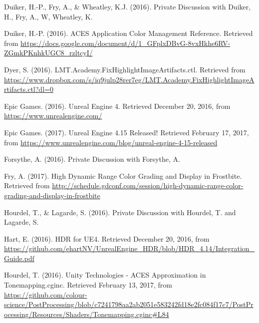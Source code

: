 \documentclass[conference]{IEEEtran}
\begin{document}
\begin{thebibliography}{1}
\renewcommand\@biblabel[1]{[DFW16]}
\bibitem{}
Duiker, H.-P., Fry, A., \& Wheatley, K.J. (2016). Private Discussion with Duiker, H., Fry, A., W, Wheatley, K. \vspace{2mm}

\renewcommand\@biblabel[1]{[Dui16]}
\bibitem{}
Duiker, H.-P. (2016). ACES Application Color Management Reference. Retrieved from \url{https://docs.google.com/document/d/1_GFplxDBvG-8vxHkhe6RV-ZGmkPKnhkUGC8_rzltcyI/} \vspace{2mm}

\renewcommand\@biblabel[1]{[Dye16]}
\bibitem{}
Dyer, S. (2016). LMT.Academy.FixHighlightImageArtifacts.ctl. Retrieved from \url{https://www.dropbox.com/s/iq9julp28rer7eg/LMT.Academy.FixHighlightImageArtifacts.ctl?dl=0} \vspace{2mm}

\renewcommand\@biblabel[1]{[Epi16]}
\bibitem{}
Epic Games. (2016). Unreal Engine 4. Retrieved December 20, 2016, from \url{https://www.unrealengine.com/} \vspace{2mm}

\renewcommand\@biblabel[1]{[Epi17]}
\bibitem{}
Epic Games. (2017). Unreal Engine 4.15 Released! Retrieved February 17, 2017, from \url{https://www.unrealengine.com/blog/unreal-engine-4-15-released} \vspace{2mm}

\renewcommand\@biblabel[1]{[For16]}
\bibitem{}
Forsythe, A. (2016). Private Discussion with Forsythe, A. \vspace{2mm}

\renewcommand\@biblabel[1]{[Fry17]}
\bibitem{}
Fry, A. (2017). High Dynamic Range Color Grading and Display in Frostbite. Retrieved from \url{http://schedule.gdconf.com/session/high-dynamic-range-color-grading-and-display-in-frostbite} \vspace{2mm}

\renewcommand\@biblabel[1]{[HL16]}
\bibitem{}
Hourdel, T., \& Lagarde, S. (2016). Private Discussion with Hourdel, T. and Lagarde, S. \vspace{2mm}

\renewcommand\@biblabel[1]{[Har16]}
\bibitem{}
Hart, E. (2016). HDR for UE4. Retrieved December 20, 2016, from \url{https://github.com/ehartNV/UnrealEngine_HDR/blob/HDR_4.14/Integration_Guide.pdf} \vspace{2mm}

\renewcommand\@biblabel[1]{[Hou16]}
\bibitem{}
Hourdel, T. (2016). Unity Technologies - ACES Approximation in Tonemapping.cginc. Retrieved February 13, 2017, from \url{https://github.com/colour-science/PostProcessing/blob/c7241798aa2ab2051e583242fd18e2fc084f17c7/PostProcessing/Resources/Shaders/Tonemapping.cginc#L84} \vspace{2mm}


\end{thebibliography}
\end{document}
